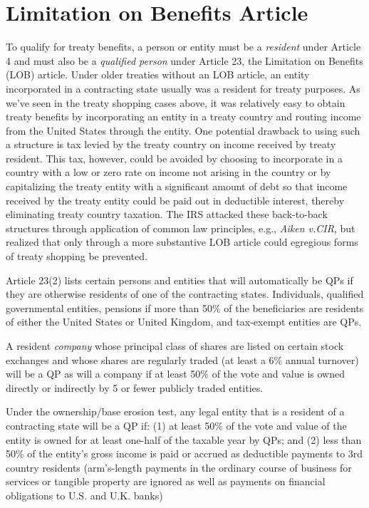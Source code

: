    \section{Limitation on Benefits Article} 

To qualify for treaty benefits, a person or entity must be a \emph{resident} under Article 4 and must also be a \emph{qualified person} under Article 23, the Limitation on Benefits (LOB) article.  Under older treaties without an LOB article, an entity incorporated in a contracting state usually was a resident for treaty purposes.  As we've seen in the treaty shopping cases above, it was relatively easy to obtain treaty benefits by incorporating an entity in a treaty country and routing income from the United States through the entity.  One potential drawback to using such a structure is tax levied by the treaty country on income received by treaty resident.  This tax, however, could be avoided by choosing to incorporate in a country with a low or zero rate on income not arising in the country or by capitalizing the treaty entity with a significant amount of debt so that income received by the treaty entity could be paid out in deductible interest, thereby eliminating treaty country taxation.  The IRS attacked these back-to-back structures through application of common law principles, e.g., \emph{Aiken v.\@ CIR}, but realized that only through a more substantive LOB article could egregious forms of treaty shopping be prevented.  

Article 23(2) lists certain persons and entities that will automatically be QPs if they are otherwise residents of one of the contracting states.  Individuals, qualified governmental entities, pensions if more than 50\% of the beneficiaries are residents of either the United States or United Kingdom, and tax-exempt entities are QPs.  

A resident \emph{company}  whose principal class of shares are listed on certain stock exchanges and whose shares are regularly traded (at least a 6\% annual turnover) will be a QP as will a company if at least 50\% of the vote and value is owned directly or indirectly by 5 or fewer publicly traded entities.  

Under the ownership/base erosion test, any legal entity that is a resident of a contracting state will be a QP if: (1) at least 50\% of the vote and value of the entity is owned for at least one-half of the taxable year by QPs; and (2) less than 50\% of the entity's gross income is paid or accrued as deductible payments to 3rd country residents (arm's-length payments in the ordinary course of business for services or tangible property are ignored as well as payments on financial obligations to U.S. and U.K. banks) 
      
